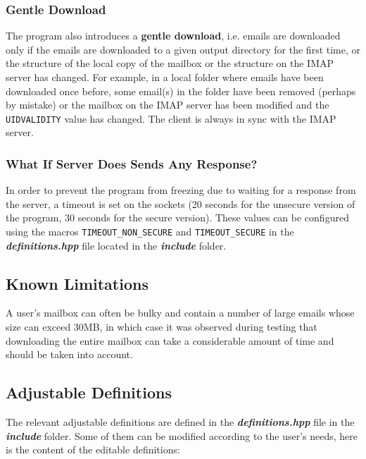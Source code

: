 \documentclass[a4paper,11pt]{article}
\begin{document}
\subsubsection{Gentle Download}
The program also introduces a \textbf{gentle download}, i.e. emails are downloaded only if the 
emails are downloaded to a given output directory for the first time, or the structure of 
the local copy of the mailbox or the structure on the IMAP server has changed. For example, 
in a local folder where emails have been downloaded once before, some email(s) in the folder 
have been removed (perhaps by mistake) or the mailbox on the IMAP server has been modified 
and the \verb!UIDVALIDITY! value has changed. The client is always in sync with the IMAP server.

\subsubsection{What If Server Does Sends Any Response?}
In order to prevent the program from freezing due to waiting for a response from the server, 
a timeout is set on the sockets (20 seconds for the unsecure version of the program, 
30 seconds for the secure version). These values can be configured using the macros 
\verb!TIMEOUT_NON_SECURE! and \verb!TIMEOUT_SECURE! in the \textbf{\textit{definitions.hpp}} 
file located in the \textbf{\textit{include}} folder.

\subsection{Known Limitations}
A user's mailbox can often be bulky and contain a number of large emails whose size can exceed 30MB, 
in which case it was observed during testing that downloading the entire mailbox can take a 
considerable amount of time and should be taken into account. 

\newpage

\subsection{Adjustable Definitions}
The relevant adjustable definitions are defined in the \textbf{\textit{definitions.hpp}} file in the \textbf{\textit{include}} folder. 
Some of them can be modified according to the user's needs, here is the content of the 
editable definitions:
\end{document}
